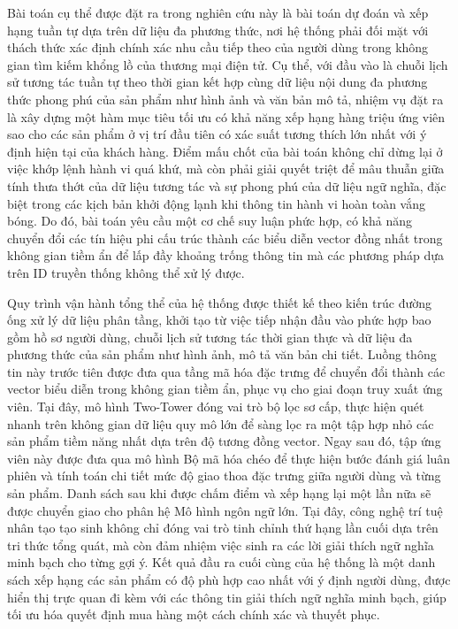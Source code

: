 Bài toán cụ thể được đặt ra trong nghiên cứu này là bài toán dự đoán và xếp hạng tuần tự dựa trên dữ liệu đa phương thức, nơi hệ thống phải đối mặt với thách thức xác định chính xác nhu cầu tiếp theo của người dùng trong không gian tìm kiếm khổng lồ của thương mại điện tử. Cụ thể, với đầu vào là chuỗi lịch sử tương tác tuần tự theo thời gian kết hợp cùng dữ liệu nội dung đa phương thức phong phú của sản phẩm như hình ảnh và văn bản mô tả, nhiệm vụ đặt ra là xây dựng một hàm mục tiêu tối ưu có khả năng xếp hạng hàng triệu ứng viên sao cho các sản phẩm ở vị trí đầu tiên có xác suất tương thích lớn nhất với ý định hiện tại của khách hàng. Điểm mấu chốt của bài toán không chỉ dừng lại ở việc khớp lệnh hành vi quá khứ, mà còn phải giải quyết triệt để mâu thuẫn giữa tính thưa thớt của dữ liệu tương tác và sự phong phú của dữ liệu ngữ nghĩa, đặc biệt trong các kịch bản khởi động lạnh khi thông tin hành vi hoàn toàn vắng bóng. Do đó, bài toán yêu cầu một cơ chế suy luận phức hợp, có khả năng chuyển đổi các tín hiệu phi cấu trúc thành các biểu diễn vector đồng nhất trong không gian tiềm ẩn để lấp đầy khoảng trống thông tin mà các phương pháp dựa trên ID truyền thống không thể xử lý được.

Quy trình vận hành tổng thể của hệ thống được thiết kế theo kiến trúc đường ống xử lý dữ liệu phân tầng, khởi tạo từ việc tiếp nhận đầu vào phức hợp bao gồm hồ sơ người dùng, chuỗi lịch sử tương tác thời gian thực và dữ liệu đa phương thức của sản phẩm như hình ảnh, mô tả văn bản chi tiết. Luồng thông tin này trước tiên được đưa qua tầng mã hóa đặc trưng để chuyển đổi thành các vector biểu diễn trong không gian tiềm ẩn, phục vụ cho giai đoạn truy xuất ứng viên. Tại đây, mô hình Two-Tower đóng vai trò bộ lọc sơ cấp, thực hiện quét nhanh trên không gian dữ liệu quy mô lớn để sàng lọc ra một tập hợp nhỏ các sản phẩm tiềm năng nhất dựa trên độ tương đồng vector. Ngay sau đó, tập ứng viên này được đưa qua mô hình Bộ mã hóa chéo để thực hiện bước đánh giá luân phiên và tính toán chi tiết mức độ giao thoa đặc trưng giữa người dùng và từng sản phẩm. Danh sách sau khi được chấm điểm và xếp hạng lại một lần nữa sẽ được chuyển giao cho phân hệ Mô hình ngôn ngữ lớn. Tại đây, công nghệ trí tuệ nhân tạo tạo sinh không chỉ đóng vai trò tinh chỉnh thứ hạng lần cuối dựa trên tri thức tổng quát, mà còn đảm nhiệm việc sinh ra các lời giải thích ngữ nghĩa minh bạch cho từng gợi ý. Kết quả đầu ra cuối cùng của hệ thống là một danh sách xếp hạng các sản phẩm có độ phù hợp cao nhất với ý định người dùng, được hiển thị trực quan đi kèm với các thông tin giải thích ngữ nghĩa minh bạch, giúp tối ưu hóa quyết định mua hàng một cách chính xác và thuyết phục.

